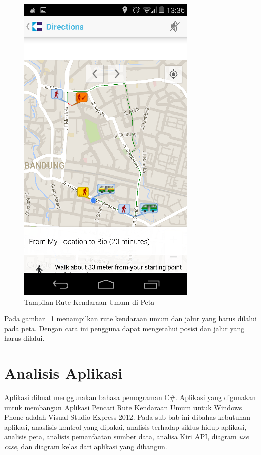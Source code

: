 \begin{figure}[h]
	\centering
		\includegraphics[scale=0.5]{Gambar/KIRI_Android/tampilan_peta}
	\caption{Tampilan Rute Kendaraan Umum di Peta}
	\label{fig:peta}
\end{figure}
\newpage
Pada gambar ~\ref{fig:peta} menampilkan rute kendaraan umum dan jalur yang harus dilalui pada peta. Dengan cara ini pengguna dapat mengetahui posisi dan jalur yang harus dilalui.


\section{Analisis Aplikasi}
\label{lab:Analisis Aplikasi}
\hspace{0.5cm} Aplikasi dibuat menggunakan bahasa pemograman C\#. Aplikasi yang digunakan untuk membangun Aplikasi Pencari Rute Kendaraan Umum untuk Windows Phone adalah Visual Studio Express 2012. Pada sub-bab ini dibahas kebutuhan aplikasi, anaslisis kontrol yang dipakai, analisis terhadap siklus hidup aplikasi, analisis peta, analisis pemanfaatan sumber data, analisa Kiri API, diagram \textit{use case}, dan diagram kelas dari aplikasi yang dibangun. 

